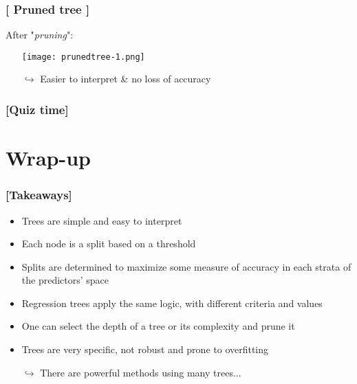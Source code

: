 \documentclass[xcolor=x11names,compress]{beamer}
\renewcommand{\(}{\begin{columns}}
\renewcommand{\)}{\end{columns}}
\newcommand{\<}[1]{\begin{column}{#1}}
\renewcommand{\>}{\end{column}}
\begin{document}
\begin{frame}
\frametitle{\textcolor{brique}{[ Pruned tree ]}}
After "\textit{pruning}":
\pause
\begin{itemize}[<+->]
    \item[] \texttt{[image: prunedtree-1.png]}
    \item[$\hookrightarrow$] Easier to interpret \& no loss of accuracy
\end{itemize}
\end{frame}




\begin{frame} %
\frametitle{\textcolor{brique}{[Quiz time]}}
\pause
\begin{itemize}[<+->]
  \item[]
\end{itemize}
\end{frame}

\section{Wrap-up}

\begin{frame} %
\frametitle{\textcolor{brique}{[Takeaways]}}
\begin{itemize}[<+->]
\item Trees are simple and easy to interpret
\item Each node is a split based on a threshold
\item Splits are determined to maximize some measure of accuracy in each strata of the predictors' space
\item Regression trees apply the same logic, with different criteria and values
\item One can select the depth of a tree or its complexity and prune it
\item Trees are very specific, not robust and prone to overfitting
\item[$\hookrightarrow$] There are powerful methods using many trees...

\end{itemize}
\end{frame}
\end{document}
